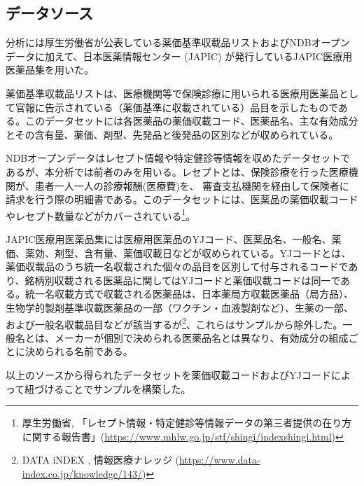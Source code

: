 \documentclass[a4j,10.5pt]{jarticle}
\begin{document}
\subsection{データソース}
分析には厚生労働省が公表している薬価基準収載品リストおよびNDBオープンデータに加えて、日本医薬情報センター (JAPIC) が発行しているJAPIC医療用医薬品集を用いた。\par
薬価基準収載品リストは、医療機関等で保険診療に用いられる医療用医薬品として官報に告示されている（薬価基準に収載されている）品目を示したものである。このデータセットには各医薬品の薬価収載コード、医薬品名、主な有効成分とその含有量、薬価、剤型、先発品と後発品の区別などが収められている。\par
NDBオープンデータはレセプト情報や特定健診等情報を収めたデータセットであるが、本分析では前者のみを用いる。レセプトとは、保険診療を行った医療機関が、患者一人一人の診療報酬(医療費)を、 審査支払機関を経由して保険者に請求を行う際の明細書である。このデータセットには、医薬品の薬価収載コードやレセプト数量などがカバーされている\footnote{厚生労働省, 「レセプト情報・特定健診等情報データの第三者提供の在り方に関する報告書」(\url{https://www.mhlw.go.jp/stf/shingi/indexshingi.html})}。\par
JAPIC医療用医薬品集には医療用医薬品のYJコード、医薬品名、一般名、薬価、薬効、剤型、含有量、薬価収載日などが収められている。YJコードとは、薬価収載品のうち統一名収載された個々の品目を区別して付与されるコードであり、銘柄別収載される医薬品に関してはYJコードと薬価収載コードは同一である。統一名収載方式で収載される医薬品は、日本薬局方収載医薬品（局方品）、生物学的製剤基準収載医薬品の一部（ワクチン・血液製剤など）、生薬の一部、および一般名収載品目などが該当するが\footnote{DATA iNDEX , 情報医療ナレッジ (\url{https://www.data-index.co.jp/knowledge/143/})}、これらはサンプルから除外した。一般名とは、メーカーが個別で決められる医薬品名とは異なり、有効成分の組成ごとに決められる名前である。\par
以上のソースから得られたデータセットを薬価収載コードおよびYJコードによって紐づけることでサンプルを構築した。
\end{document}
